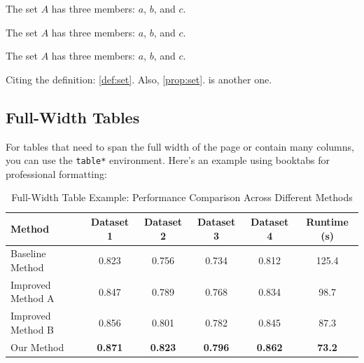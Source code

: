 \documentclass[letterpaper,10pt]{article}
\begin{document}
\begin{definition} \label{def:set}
  The set $A$ has three members: $a$, $b$, and $c$.
\end{definition}


\begin{proposition} \label{prop:set}
  The set $A$ has three members: $a$, $b$, and $c$.
\end{proposition}

\begin{corollary} \label{cor:set}
  The set $A$ has three members: $a$, $b$, and $c$.
\end{corollary}

Citing the definition: \cref{def:set}. Also, \cref{prop:set}.  is another one.


\subsection{Full-Width Tables}
\label{sec:fullwidth-tables}

For tables that need to span the full width of the page or contain many columns, you can use the \texttt{table*} environment. Here's an example using booktabs for professional formatting:

\begin{table}[t]
  \centering

  \caption{Full-Width Table Example: Performance Comparison Across Different Methods}
  \label{tab:fullwidth-example}

  \begin{tabular}{lccccc}
    \toprule
    \textbf{Method}   & \textbf{Dataset 1} & \textbf{Dataset 2} & \textbf{Dataset 3} & \textbf{Dataset 4} & \textbf{Runtime (s)} \\
    \midrule
    Baseline Method   & 0.823              & 0.756              & 0.734              & 0.812              & 125.4                \\
    Improved Method A & 0.847              & 0.789              & 0.768              & 0.834              & 98.7                 \\
    Improved Method B & 0.856              & 0.801              & 0.782              & 0.845              & 87.3                 \\
    Our Method        & \textbf{0.871}     & \textbf{0.823}     & \textbf{0.796}     & \textbf{0.862}     & \textbf{73.2}        \\
    \bottomrule
  \end{tabular}
\end{table}
\end{document}
